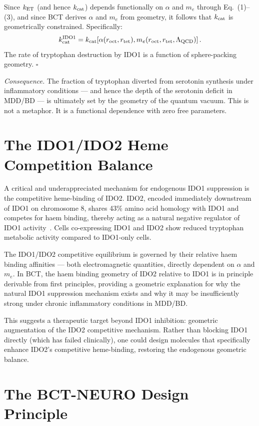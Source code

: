 \documentclass[aps,prl,preprint,superscriptaddress,floatfix]{revtex4-2}
\begin{document}
Since $k_{\rm ET}$ (and hence $k_{\rm cat}$) depends functionally on
$\alpha$ and $m_e$ through Eq.~(1)--(3), and since BCT derives $\alpha$
and $m_e$ from geometry, it follows that $k_{\rm cat}$ is geometrically
constrained. Specifically:
\begin{equation}
k_{\rm cat}^{\rm IDO1} = k_{\rm cat}\!\left[\alpha(r_{\rm oct}, r_{\rm tet}),
  m_e(r_{\rm oct}, r_{\rm tet}, \Lambda_{\rm QCD})\right].
\end{equation}
The rate of tryptophan destruction by IDO1 is a function of sphere-packing
geometry. $\square$

\textit{Consequence.} The fraction of tryptophan diverted from serotonin
synthesis under inflammatory conditions --- and hence the depth of the
serotonin deficit in MDD/BD --- is ultimately set by the geometry of the
quantum vacuum. This is not a metaphor. It is a functional dependence with
zero free parameters.

\section{The IDO1/IDO2 Heme Competition Balance}

A critical and underappreciated mechanism for endogenous IDO1 suppression
is the competitive heme-binding of IDO2. IDO2, encoded immediately downstream
of IDO1 on chromosome 8, shares 43\% amino acid homology with IDO1 and
competes for haem binding, thereby acting as a natural negative regulator
of IDO1 activity~\cite{metz2014}. Cells co-expressing IDO1 and IDO2 show
reduced tryptophan metabolic activity compared to IDO1-only cells.

The IDO1/IDO2 competitive equilibrium is governed by their relative haem
binding affinities --- both electromagnetic quantities, directly dependent
on $\alpha$ and $m_e$. In BCT, the haem binding geometry of IDO2 relative
to IDO1 is in principle derivable from first principles, providing a
geometric explanation for why the natural IDO1 suppression mechanism
exists and why it may be insufficiently strong under chronic inflammatory
conditions in MDD/BD.

This suggests a therapeutic target beyond IDO1 inhibition: geometric
augmentation of the IDO2 competitive mechanism. Rather than blocking IDO1
directly (which has failed clinically), one could design molecules that
specifically enhance IDO2's competitive heme-binding, restoring the
endogenous geometric balance.

\section{The BCT-NEURO Design Principle}
\end{document}
